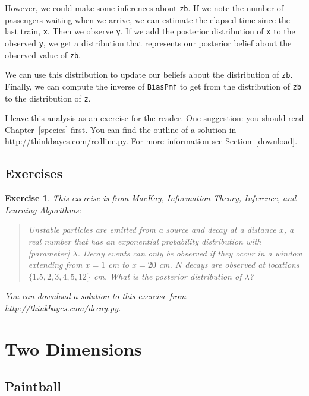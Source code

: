 \documentclass[12pt]{book}
\theoremstyle{exercise}
\newtheorem{exercise}{Exercise}[chapter]
\begin{document}
However, we could make some inferences about {\tt zb}.  If we note
the number of passengers waiting when we arrive, we can estimate
the elapsed time since the last train, {\tt x}.  Then we observe
{\tt y}.  If we add the posterior distribution of {\tt x} to
the observed {\tt y}, we get a distribution that represents
our posterior belief about the observed value of {\tt zb}.

We can use this distribution to update our beliefs about the
distribution of {\tt zb}.  Finally, we can compute the
inverse of {\tt BiasPmf} to get from the distribution of {\tt zb}
to the distribution of {\tt z}.

I leave this analysis as an exercise for the
reader.  One suggestion: you should read Chapter~\ref{species} first.
You can find the outline of
a solution in \url{http://thinkbayes.com/redline.py}.
  For more information
see Section~\ref{download}.

\section{Exercises}

\begin{exercise}
This exercise is from
MacKay, {\em Information Theory, Inference, and Learning Algorithms}:

\begin{quote}
    Unstable particles are emitted from a source and decay at a
distance $x$, a real number that has an exponential probability
distribution with [parameter] $\lambda$.  Decay events can only be
observed if they occur in a window extending from $x=1$ cm to $x=20$
cm.  $N$ decays are observed at locations $\{ 1.5, 2, 3, 4, 5, 12 \}$
cm.  What is the posterior distribution of $\lambda$?

\end{quote}

You can download a solution to this exercise from
\url{http://thinkbayes.com/decay.py}.

\end{exercise}


\chapter{Two Dimensions}
\label{paintball}

\section{Paintball}
\end{document}
